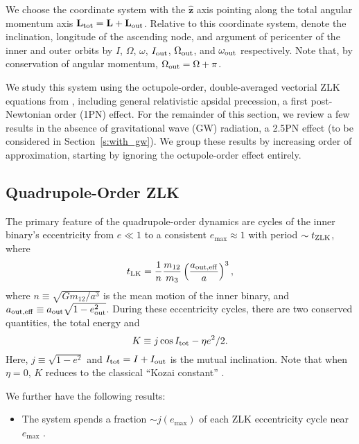 \documentclass[
        fleqn,
        usenatbib,
    ]{mnras}
\newcommand*{\p}[1]{\left(#1\right)}
\newcommand*{\bm}[1]{\mathbf{#1}}
\newcommand*{\uv}[1]{\hat{\mathbf{#1}}}
\begin{document}
We choose the coordinate system with the $\uv{z}$ axis pointing along the total
angular momentum axis $\bm{L}_{\rm tot} = \bm{L} + \bm{L}_{\rm out}$. Relative
to this coordinate system, denote the inclination, longitude of the ascending
node, and argument of pericenter of the inner and outer orbits by $I$, $\Omega$,
$\omega$, $I_{\rm out}$, $\Omega_{\rm out}$, and $\omega_{\rm out}$
respectively. Note that, by conservation of angular momentum, $\Omega_{\rm out}
= \Omega + \pi$.

We study this system using the octupole-order, double-averaged vectorial ZLK
equations from \citet{LML15}, including general relativistic apsidal precession,
a first post-Newtonian order (1PN) effect. For the remainder of this section, we
review a few results in the absence of gravitational wave (GW) radiation, a
2.5PN effect (to be considered in Section~\ref{s:with_gw}). We group these
results by increasing order of approximation, starting by ignoring the
octupole-order effect entirely.

\subsection{Quadrupole-Order ZLK}

The primary feature of the quadrupole-order dynamics are cycles of the inner
binary's eccentricity from $e \ll 1$ to a consistent $e_{\max} \approx 1$ with
period $\sim t_{\rm ZLK}$, where
\begin{equation}
    t_{\rm LK} = \frac{1}{n}\frac{m_{12}}{m_3}
            \p{\frac{a_{\rm out, eff}}{a}}^3,
\end{equation}
where $n \equiv \sqrt{Gm_{12} / a^3}$ is the mean motion of the inner binary,
and $a_{\rm out, eff} \equiv a_{\rm out}\sqrt{1 - e_{\rm out}^2}$. During these
eccentricity cycles, there are two conserved quantities, the total energy and
\begin{equation}
    K \equiv j \cos I_{\rm tot} - \eta e^2 / 2.
\end{equation}
Here, $j \equiv \sqrt{1 - e^2}$ and $I_{\rm tot} = I + I_{\rm out}$ is the
mutual inclination. Note that when $\eta = 0$, $K$ reduces to the classical
``Kozai constant'' \citep{LML15}.

We further have the following results:
\begin{itemize}
    \item The system spends a fraction $\sim j(e_{\max})$ of each ZLK
        eccentricity cycle near $e_{\max}$ \citep{anderson2016formation}.
\end{itemize}
\end{document}
